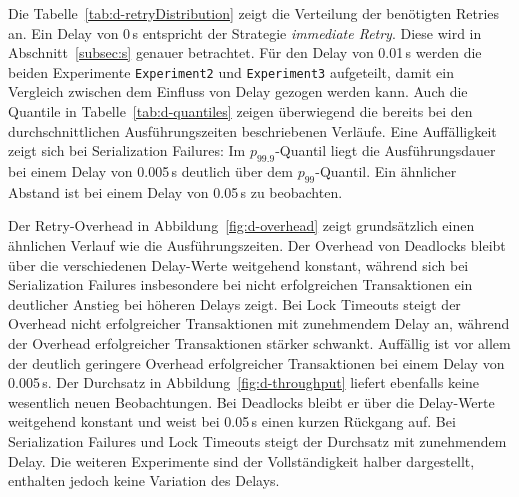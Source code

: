 

Die Tabelle~\ref{tab:d-retryDistribution} zeigt die Verteilung der benötigten Retries an.
Ein Delay von 0\,s entspricht der Strategie \emph{immediate Retry}.
Diese wird in Abschnitt~\ref{subsec:s} genauer betrachtet.
Für den Delay von 0.01\,s werden die beiden Experimente \texttt{Experiment2} und \texttt{Experiment3}
aufgeteilt, damit ein Vergleich zwischen dem Einfluss von Delay gezogen werden kann.
Auch die Quantile in Tabelle~\ref{tab:d-quantiles} zeigen überwiegend die bereits bei den durchschnittlichen
Ausführungszeiten beschriebenen Verläufe.
Eine Auffälligkeit zeigt sich bei Serialization Failures: Im $p_{99.9}$-Quantil liegt die Ausführungsdauer bei einem
Delay von 0.005\,s deutlich über dem $p_{99}$-Quantil.
Ein ähnlicher Abstand ist bei einem Delay von 0.05\,s zu beobachten.

Der Retry-Overhead in Abbildung~\ref{fig:d-overhead} zeigt grundsätzlich einen ähnlichen Verlauf wie die
Ausführungszeiten.
Der Overhead von Deadlocks bleibt über die verschiedenen Delay-Werte weitgehend konstant, während sich bei
Serialization Failures insbesondere bei nicht erfolgreichen Transaktionen ein deutlicher Anstieg bei höheren
Delays zeigt.
Bei Lock Timeouts steigt der Overhead nicht erfolgreicher Transaktionen mit zunehmendem Delay an, während der Overhead
erfolgreicher Transaktionen stärker schwankt.
Auffällig ist vor allem der deutlich geringere Overhead erfolgreicher Transaktionen bei einem Delay von 0.005\,s.
Der Durchsatz in Abbildung~\ref{fig:d-throughput} liefert ebenfalls keine wesentlich neuen Beobachtungen.
Bei Deadlocks bleibt er über die Delay-Werte weitgehend konstant und weist bei 0.05\,s einen kurzen Rückgang auf.
Bei Serialization Failures und Lock Timeouts steigt der Durchsatz mit zunehmendem Delay.
Die weiteren Experimente sind der Vollständigkeit halber dargestellt, enthalten jedoch keine Variation des Delays.